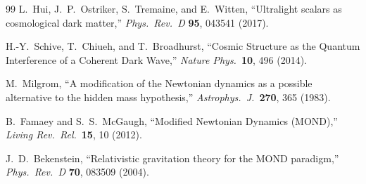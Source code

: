 \documentclass[11pt,a4paper]{article}
\begin{document}
\begin{thebibliography}{99}
L.~Hui, J.~P.~Ostriker, S.~Tremaine, and E.~Witten,
``Ultralight scalars as cosmological dark matter,''
\textit{Phys.\ Rev.\ D} \textbf{95}, 043541 (2017).

H.-Y.~Schive, T.~Chiueh, and T.~Broadhurst,
``Cosmic Structure as the Quantum Interference of a Coherent Dark Wave,''
\textit{Nature Phys.}\ \textbf{10}, 496 (2014).

M.~Milgrom,
``A modification of the Newtonian dynamics as a possible alternative
to the hidden mass hypothesis,''
\textit{Astrophys.\ J.}\ \textbf{270}, 365 (1983).

B.~Famaey and S.~S.~McGaugh,
``Modified Newtonian Dynamics (MOND),''
\textit{Living Rev.\ Rel.}\ \textbf{15}, 10 (2012).

J.~D.~Bekenstein,
``Relativistic gravitation theory for the MOND paradigm,''
\textit{Phys.\ Rev.\ D} \textbf{70}, 083509 (2004).

\end{thebibliography}
\end{document}
